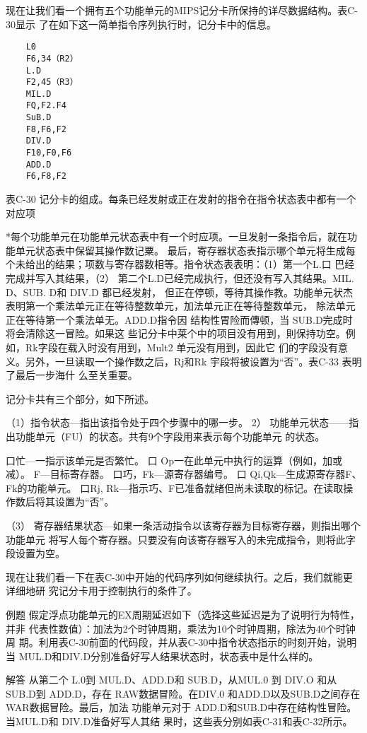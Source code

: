 现在让我们看一个拥有五个功能单元的MIPS记分卡所保持的详尽数据结构。表C-30显示
了在如下这一简单指令序列执行时，记分卡中的信息。
\begin{verbatim}
    L0
    F6,34（R2）
    L.D
    F2,45（R3）
    MIL.D
    FQ,F2.F4
    SuB.D
    F8,F6,F2
    DIV.D
    F10,F0,F6
    ADD.D
    F6,F8,F2
\end{verbatim}
表C-30 记分卡的组成。每条已经发射或正在发射的指令在指令状态表中都有一个对应项

*每个功能单元在功能单元状态表中有一个时应项。一旦发射一条指令后，就在功能单元状态表中保留其操作数记粟。
最后，寄存器状态表指示哪个单元将生成每个未给出的结果；项数与寄存器数相等。指令状态表表明：（1）第一个L.口
巴经完成并写入其结果，（2） 第二个L.D已经完成执行，但还没有写入其结果。MIL. D、SUB. D和 DIV.D 都已经发射，
但正在停顿，等待其操作教。功能单元状杰表明第一个乘法单元正在等待整数单元，加法单元正在等待整数单元，
除法单元正在等待第一个乘法单无。ADD.D指令因 结构性胃险而傳顿，当 SUB.D完成时将会清除这一冒险。如果这
些记分卡中莱个中的项目没有用到，則保持功空。例如，Rk字段在载入时没有用到，Mult2 单元没有用到，因此它
们的字段没有意义。另外，一旦读取一个操作数之后，Rj和Rk 宇段将被设置为“否”。表C-33 表明了最后一步海什
么至关重要。

记分卡共有三个部分，如下所述。

（1）指令状态—指出该指令处于四个步骤中的哪一步。
2） 功能单元状态——指出功能单元（FU）的状态。共有9个字段用来表示每个功能单元
的状态。

口忙—一指示该单元是否繁忙。
口 Op一在此单元中执行的运算（例如，加或减）。
F—目标寄存器。
口巧，Fk—源寄存器编号。
口 Qi,Qk—生成源寄存器F、Fk的功能单元。
口Rj, Rk—指示巧、F已准备就绪但尚未读取的标记。在读取操作数后将其设置为“否”。

（3） 寄存器结果状态—如果一条活动指令以该寄存器为目标寄存器，则指出哪个功能单元
将写人每个寄存器。只要没有向该寄存器写入的未完成指令，则将此字段设置为空。

现在让我们看一下在表C-30中开始的代码序列如何继续执行。之后，我们就能更详细地研
究记分卡用于控制执行的条件了。

例题
假定浮点功能单元的EX周期延迟如下（选择这些延迟是为了说明行为特性，并非
代表性数值）：加法为2个时钟周期，乘法为10个时钟周期，除法为40个时钟周
期。利用表C-30前面的代码段，并从表C-30中指令状态指示的时刻开始，说明当
MUL.D和DIV.D分别准备好写人结果状态时，状态表中是什么样的。

解答
从第二个 L.0到 MUL.D、ADD.D和 SUB.D，从MUL.0 到 DIV.O 和从 SUB.D到 ADD.D，存在
RAW数据冒险。在DIV.0 和ADD.D以及SUB.D之间存在WAR数据冒险。最后，加法
功能单元对于 ADD.D和SUB.D中存在结构性冒险。当MUL.D和 DIV.D准备好写人其结
果时，这些表分别如表C-31和表C-32所示。

